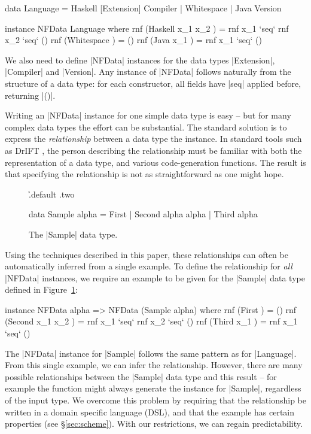 \documentclass[preprint,draft]{sigplanconf}
\begin{document}
\begin{code}
data Language  =  Haskell [Extension] Compiler
               |  Whitespace
               |  Java Version

instance NFData Language where
    rnf (Haskell x_1 x_2  ) = rnf x_1 `seq` rnf x_2 `seq` ()
    rnf (Whitespace       ) = ()
    rnf (Java x_1         ) = rnf x_1 `seq` ()
\end{code}

We also need to define |NFData| instances for the data types |Extension|, |Compiler| and |Version|. Any instance of |NFData| follows naturally from the structure of a data type: for each constructor, all fields have |seq| applied before, returning |()|.

Writing an |NFData| instance for one simple data type is easy -- but for many complex data types the effort can be substantial. The standard solution is to express the \textit{relationship} between a data type the instance. In standard tools such as DrIFT \cite{drift}, the person describing the relationship must be familiar with both the representation of a data type, and various code-generation functions. The result is that specifying the relationship is not as straightforward as one might hope.

\begin{figure}
\h{.default .two}\begin{code}
data Sample alpha  =  First
                   |  Second  alpha alpha
                   |  Third   alpha
\end{code}
\caption{The |Sample| data type.}
\label{fig:sample}
\end{figure}

Using the techniques described in this paper, these relationships can often be automatically inferred from a single example. To define the relationship for \textit{all} |NFData| instances, we require an example to be given for the |Sample| data type defined in Figure~\ref{fig:sample}:

\begin{code}
instance NFData alpha => NFData (Sample alpha) where
    rnf (First           ) = ()
    rnf (Second x_1 x_2  ) = rnf x_1 `seq` rnf x_2 `seq` ()
    rnf (Third x_1       ) = rnf x_1 `seq` ()
\end{code}

The |NFData| instance for |Sample| follows the same pattern as for |Language|. From this single example, we can infer the relationship. However, there are many possible relationships between the |Sample| data type and this result -- for example the function might always generate the instance for |Sample|, regardless of the input type. We overcome this problem by requiring that the relationship be written in a domain specific language (DSL), and that the example has certain properties (see \S\ref{sec:scheme}). With our restrictions, we can regain predictability.
\end{document}
